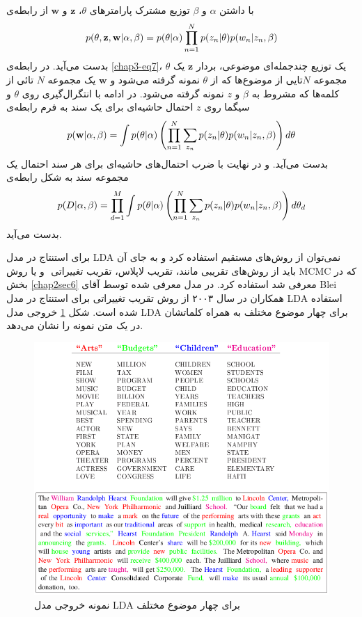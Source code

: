 با داشتن
$\alpha$
و
$\beta$
توزیع مشترک پارامترهای
$\theta$، $\textbf{z}$
و
$\textbf{w}$
از رابطه‌ی
\begin{align}
	\centering
	\label{chap3-eq7}
	p(\theta,\textbf{z},\textbf{w}|\alpha,\beta) = p(\theta|\alpha)\prod_{n=1}^{N}p(z_n|\theta)p(w_n|z_n,\beta)
\end{align}
بدست می‌‌آید. در رابطه‌ی
\ref{chap3-eq7}، $\theta$
یک توزیع چندجمله‌ا‌ی موضوعی، بردار
$\textbf{z}$
یک مجموعه
$N$تایی
‌ از موضوع‌ها که از
$\theta$
نمونه گرفته می‌‌شود و
$\textbf{w}$
یک مجموعه
$N$
تائی‌ از کلمه‌ها که مشروط به
$\beta$
و
$z$
نمونه گرفته می‌‌شود. در ادامه با انتگرال‌گیری روی
$\theta$
و سیگما روی
$z$
 احتمال حاشیه‌ای برای یک سند به فرم رابطه‌ی
\begin{align}
	\centering
	\label{chap3-eq8}
	p(\textbf{w}|\alpha,\beta) = \int p(\theta|\alpha) \left( \prod_{n=1}^{N} \sum_{z_n}p(z_n|\theta)p(w_n|z_n,\beta) \right)   d\theta
\end{align}
  بدست می‌‌آید. و در نهایت با ضرب احتمال‌های حاشیه‌ای برای هر سند احتمال یک مجموعه سند به شکل رابطه‌‌ی
\begin{align}
	\centering
	\label{chap3-eq9}
	p(D|\alpha,\beta) =\prod_{d=1}^{M} \int p(\theta|\alpha) \left( \prod_{n=1}^{N} \sum_{z_n}p(z_n|\theta)p(w_n|z_n,\beta) \right)d\theta_d
\end{align}
  بدست می‌‌آید.

برای استنتاج در مدل
LDA
نمی‌توان از روش‌های مستقیم استفاده کرد و به جای آن باید از روش‌های تقریبی مانند، تقریب لاپلاس،
 تقریب تغییراتی
 ‌ و یا روش
MCMC
که در بخش
\ref{chap2sec6}
معرفی‌ شد استفاده کرد. در مدل معرفی‌ شده توسط آقای
Blei
همکاران 
\cite{blei2003latent}
در سال ۲۰۰۳ از روش تقریب تغییراتی‌ برای استنتاج در مدل
LDA
استفاده شده است. شکل
\ref{chap3-fig11}
خروجی مدل
LDA
برای چهار موضوع مختلف به همراه کلماتشان در یک متن نمونه را نشان می‌‌دهد.

	\begin{figure}[!t]
		\centering
		\includegraphics[scale=0.4]{chap3-img/LDAexample}
		\caption{نمونه خروجی مدل LDA برای چهار موضوع مختلف \cite{blei2003latent}}
		\label{chap3-fig11}
	\end{figure}



